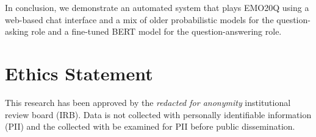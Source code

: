\documentclass[conference]{IEEEtran}
\begin{document}
In conclusion, we demonstrate an automated system that plays EMO20Q
using a web-based chat interface and a mix of older probabilistic
models for the question-asking role and a fine-tuned BERT model for
the question-answering role.




\section{Ethics Statement}

This research has been approved by the
{\it redacted for anonymity}
institutional review board (IRB).  Data is not collected with
personally identifiable information (PII) and the collected with be
examined for PII before public dissemination.





\end{document}
